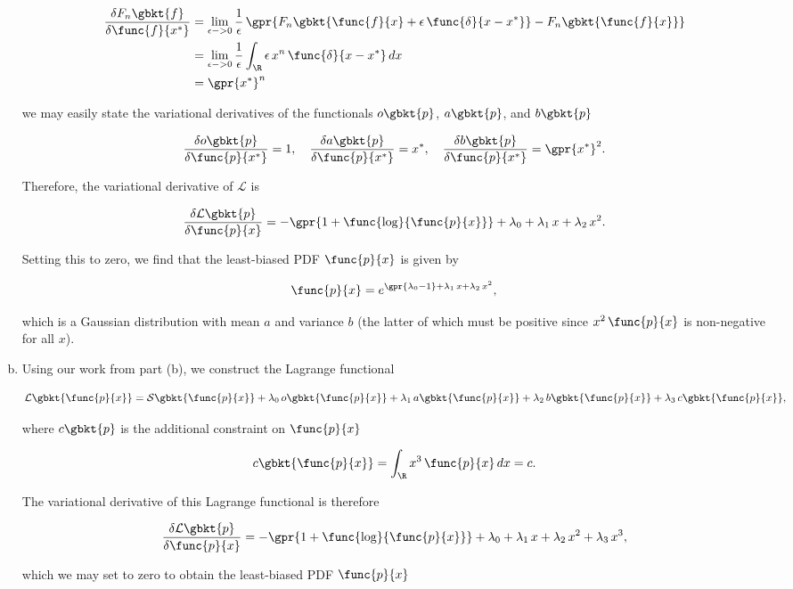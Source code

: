 \begin{enumerate}[(a)]
	\begin{align*}
	\frac{\delta F_n\gbkt{f}}{\delta\func{f}{x^*}} &= \lim_{\epsilon -> 0} \frac{1}{\epsilon}\,\gpr{F_n\gbkt{\func{f}{x} + \epsilon\,\func{\delta}{x - x^{*}}} - F_n\gbkt{\func{f}{x}}} \\
	&= \lim_{\epsilon -> 0} \frac{1}{\epsilon} \int_{\R} \epsilon\,x^n\,\func{\delta}{x - x^{*}}\,dx \\
	&= \gpr{x^{*}}^n
	\end{align*}
	
	we may easily state the variational derivatives of the functionals $o\gbkt{p}$, $a\gbkt{p}$, and $b\gbkt{p}$
	
	$$\frac{\delta o\gbkt{p}}{\delta\func{p}{x^*}} = 1,\quad \frac{\delta a\gbkt{p}}{\delta\func{p}{x^*}} = x^{*},\quad \frac{\delta b\gbkt{p}}{\delta\func{p}{x^*}} = \gpr{x^{*}}^2.$$
	
	Therefore, the variational derivative of $\mathcal{L}$ is
	
	$$\frac{\delta \mathcal{L}\gbkt{p}}{\delta\func{p}{x}} = -\gpr{1 + \func{\log}{\func{p}{x}}} + \lambda_0 + \lambda_1\,x + \lambda_2\,x^2.$$
	
	Setting this to zero, we find that the least-biased PDF $\func{p}{x}$ is given by
	
	$$\func{p}{x} = e^{\gpr{\lambda_0 - 1} + \lambda_1\,x + \lambda_2\,x^2},$$
	
	which is a Gaussian distribution with mean $a$ and variance $b$ (the latter of which must be positive since $x^2\,\func{p}{x}$ is non-negative for all $x$).
	
	\item Using our work from part (b), we construct the Lagrange functional
	
	$$\mathcal{L}\gbkt{\func{p}{x}} = \mathcal{S}\gbkt{\func{p}{x}} + \lambda_0\,o\gbkt{\func{p}{x}} + \lambda_1\,a\gbkt{\func{p}{x}} + \lambda_2\,b\gbkt{\func{p}{x}} + \lambda_3\,c\gbkt{\func{p}{x}},$$
	
	where $c\gbkt{p}$ is the additional constraint on $\func{p}{x}$
	
	$$c\gbkt{\func{p}{x}} = \int_{\R} x^3\,\func{p}{x}\,dx = c.$$
	
	The variational derivative of this Lagrange functional is therefore
	
	$$\frac{\delta \mathcal{L}\gbkt{p}}{\delta\func{p}{x}} = -\gpr{1 + \func{\log}{\func{p}{x}}} + \lambda_0 + \lambda_1\,x + \lambda_2\,x^2 + \lambda_3\,x^3,$$
	
	which we may set to zero to obtain the least-biased PDF $\func{p}{x}$ 
	

\end{enumerate}
